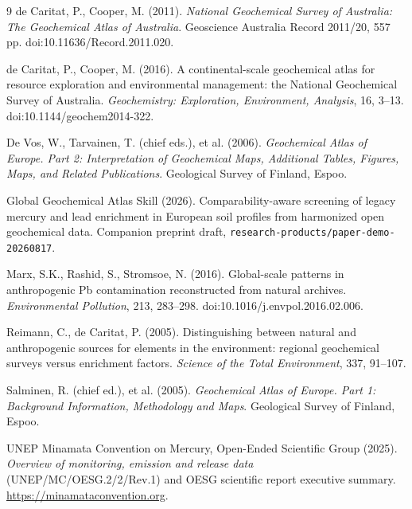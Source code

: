 \documentclass[11pt]{article}
\begin{document}
\begin{thebibliography}{9}
de Caritat, P., Cooper, M. (2011). \emph{National Geochemical Survey of
Australia: The Geochemical Atlas of Australia}. Geoscience Australia Record
2011/20, 557 pp. doi:10.11636/Record.2011.020.

de Caritat, P., Cooper, M. (2016). A continental-scale geochemical atlas for
resource exploration and environmental management: the National Geochemical
Survey of Australia. \emph{Geochemistry: Exploration, Environment,
Analysis}, 16, 3--13. doi:10.1144/geochem2014-322.

De Vos, W., Tarvainen, T. (chief eds.), et al. (2006). \emph{Geochemical
Atlas of Europe. Part 2: Interpretation of Geochemical Maps, Additional
Tables, Figures, Maps, and Related Publications}. Geological Survey of
Finland, Espoo.

Global Geochemical Atlas Skill (2026). Comparability-aware screening of
legacy mercury and lead enrichment in European soil profiles from harmonized
open geochemical data. Companion preprint draft,
\texttt{research-products/paper-demo-20260817}.

Marx, S.K., Rashid, S., Stromsoe, N. (2016). Global-scale patterns in
anthropogenic Pb contamination reconstructed from natural archives.
\emph{Environmental Pollution}, 213, 283--298.
doi:10.1016/j.envpol.2016.02.006.

Reimann, C., de Caritat, P. (2005). Distinguishing between natural and
anthropogenic sources for elements in the environment: regional geochemical
surveys versus enrichment factors. \emph{Science of the Total Environment},
337, 91--107.

Salminen, R. (chief ed.), et al. (2005). \emph{Geochemical Atlas of Europe.
Part 1: Background Information, Methodology and Maps}. Geological Survey of
Finland, Espoo.

UNEP Minamata Convention on Mercury, Open-Ended Scientific Group (2025).
\emph{Overview of monitoring, emission and release data}
(UNEP/MC/OESG.2/2/Rev.1) and OESG scientific report executive summary.
\url{https://minamataconvention.org}.
\end{thebibliography}
\end{document}
